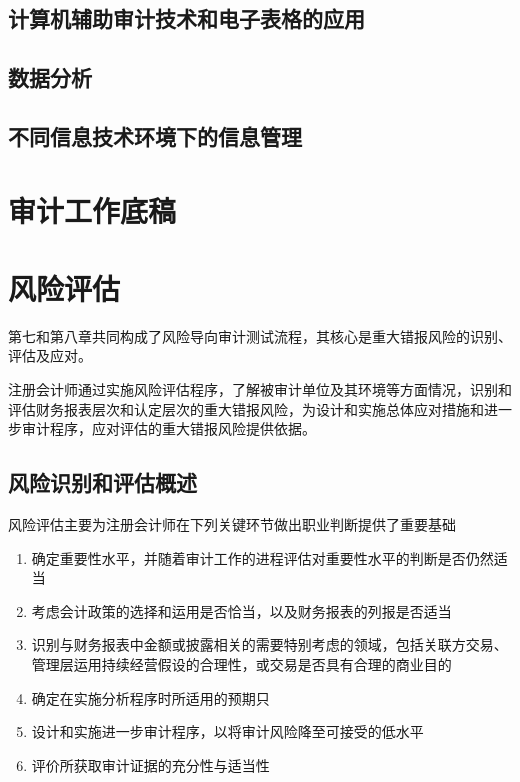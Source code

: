 \documentclass[UTF8,12pt]{ctexart}
\numberwithin{equation}{section} %
\numberwithin{figure}{section}
\numberwithin{table}{section}
\begin{document}
	\subsection{计算机辅助审计技术和电子表格的应用}
	
	\subsection{数据分析}
	
	\subsection{不同信息技术环境下的信息管理}
	
	\newpage
	\section{审计工作底稿}
	
	\newpage
	\section{风险评估}
	第七和第八章共同构成了风险导向审计测试流程，其核心是重大错报风险的识别、评估及应对。
	
	注册会计师通过实施风险评估程序，了解被审计单位及其环境等方面情况，识别和评估财务报表层次和认定层次的重大错报风险，为设计和实施总体应对措施和进一步审计程序，应对评估的重大错报风险提供依据。
	\subsection{风险识别和评估概述}
	风险评估主要为注册会计师在下列关键环节做出职业判断提供了重要基础
	\begin{enumerate}
		\item 确定重要性水平，并随着审计工作的进程评估对重要性水平的判断是否仍然适当
		
		\item 考虑会计政策的选择和运用是否恰当，以及财务报表的列报是否适当
		
		\item 识别与财务报表中金额或披露相关的需要特别考虑的领域，包括关联方交易、管理层运用持续经营假设的合理性，或交易是否具有合理的商业目的
		
		\item 确定在实施分析程序时所适用的预期只
		
		\item 设计和实施进一步审计程序，以将审计风险降至可接受的低水平
		
		\item 评价所获取审计证据的充分性与适当性
	\end{enumerate}
	
\end{document}
